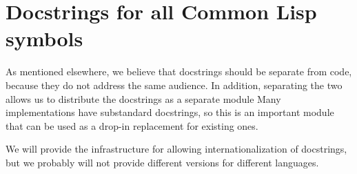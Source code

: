 \chapter{Docstrings for all Common Lisp symbols}

As mentioned elsewhere, we believe that docstrings should be separate
from code, because they do not address the same audience.  In
addition, separating the two allows us to distribute the docstrings as
a separate module Many implementations have substandard docstrings, so
this is an important module that can be used as a drop-in replacement
for existing ones.

We will provide the infrastructure for allowing internationalization
of docstrings, but we probably will not provide different versions for
different languages. 


